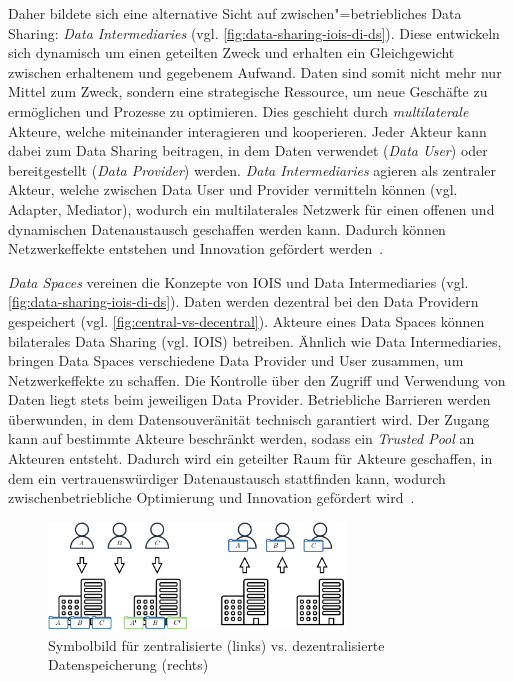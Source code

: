 Daher bildete sich eine alternative Sicht auf zwischen"=betriebliches Data Sharing: \emph{Data Intermediaries} (vgl. \autoref{fig:data-sharing-iois-di-ds}).
Diese entwickeln sich dynamisch um einen geteilten Zweck und erhalten ein Gleichgewicht zwischen erhaltenem und gegebenem Aufwand.
Daten sind somit nicht mehr nur Mittel zum Zweck, sondern eine strategische Ressource, um neue Geschäfte zu ermöglichen und Prozesse zu optimieren.
Dies geschieht durch \emph{multilaterale} Akteure, welche miteinander interagieren und kooperieren.
Jeder Akteur kann dabei zum Data Sharing beitragen, in dem Daten verwendet (\emph{Data User}) oder bereitgestellt (\emph{Data Provider}) werden.
\emph{Data Intermediaries} agieren als zentraler Akteur, welche zwischen Data User und Provider vermitteln können (vgl. Adapter, Mediator), wodurch ein  multilaterales Netzwerk für einen offenen und dynamischen Datenaustausch geschaffen werden kann.
Dadurch können Netzwerkeffekte entstehen und Innovation gefördert werden~\cite{mollerIndustrialDataEcosystems2024}.

\emph{Data Spaces} vereinen die Konzepte von IOIS und Data Intermediaries (vgl. \autoref{fig:data-sharing-iois-di-ds}).
Daten werden dezentral bei den Data Providern gespeichert (vgl. \autoref{fig:central-vs-decentral}).
Akteure eines Data Spaces können bilaterales Data Sharing (vgl. IOIS) betreiben.
Ähnlich wie Data Intermediaries, bringen Data Spaces verschiedene Data Provider und User zusammen, um Netzwerkeffekte zu schaffen.
Die Kontrolle über den Zugriff und Verwendung von Daten liegt stets beim jeweiligen Data Provider.
Betriebliche Barrieren werden überwunden, in dem Datensouveränität technisch garantiert wird.
Der Zugang kann auf bestimmte Akteure beschränkt werden, sodass ein \emph{Trusted Pool} an Akteuren entsteht.
Dadurch wird ein geteilter Raum für Akteure geschaffen, in dem ein vertrauenswürdiger Datenaustausch stattfinden kann, wodurch zwischenbetriebliche Optimierung und Innovation gefördert wird~\cite{mollerIndustrialDataEcosystems2024}.

\begin{figure}[b]
    \includegraphics[width=0.7\textwidth]{./assets/central_vs_decentral.drawio.pdf}
    \caption{Symbolbild für zentralisierte (links) vs. dezentralisierte Datenspeicherung (rechts)}
    \label{fig:central-vs-decentral}
\end{figure}

